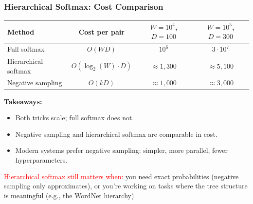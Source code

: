 \documentclass[notes,11pt, aspectratio=169]{beamer}
\begin{document}
\begin{frame}
\frametitle{Hierarchical Softmax: Cost Comparison}

\renewcommand{\arraystretch}{1.3}
\begin{center}
\small
\begin{tabular}{l c c c}
\toprule
\textbf{Method} & \textbf{Cost per pair} & \textbf{$W = 10^4$, $D = 100$} & \textbf{$W = 10^5$, $D = 300$} \\
\midrule
Full softmax & $O(W D)$ & $10^6$ & $3 \cdot 10^7$ \\
Hierarchical softmax & $O(\log_2(W) \cdot D)$ & $\approx 1{,}300$ & $\approx 5{,}100$ \\
Negative sampling & $O(k D)$ & $\approx 1{,}000$ & $\approx 3{,}000$ \\
\bottomrule
\end{tabular}
\end{center}

\vspace{8pt}
\textbf{Takeaways:}
\begin{itemize}
    \item Both tricks scale; full softmax does not.
    \item Negative sampling and hierarchical softmax are comparable in cost.
    \item Modern systems prefer negative sampling: simpler, more parallel, fewer hyperparameters.
\end{itemize}

\vspace{8pt}
\textcolor{red}{Hierarchical softmax still matters when:} you need exact probabilities (negative sampling only approximates), or you're working on tasks where the tree structure is meaningful (e.g., the WordNet hierarchy).
\end{frame}
\end{document}
